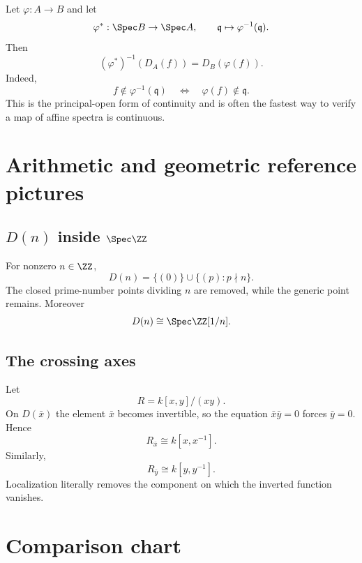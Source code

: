 Let $\varphi:A\to B$ and let
\[
\varphi^\ast:\Spec B\to\Spec A,
\qquad
\mathfrak q\mapsto\varphi^{-1}(\mathfrak q).
\]
Then
\[
(\varphi^\ast)^{-1}(D_A(f))=D_B(\varphi(f)).
\]
Indeed,
\[
f\notin\varphi^{-1}(\mathfrak q)
\quad\Longleftrightarrow\quad
\varphi(f)\notin\mathfrak q.
\]
This is the principal-open form of continuity and is often the fastest way to verify a map
of affine spectra is continuous.

\section{Arithmetic and geometric reference pictures}

\subsection{\texorpdfstring{$D(n)$ inside $\Spec\ZZ$}{D(n) inside Spec Z}}
For nonzero $n\in\ZZ$,
\[
D(n)=\{(0)\}\cup\{(p):p\nmid n\}.
\]
The closed prime-number points dividing $n$ are removed, while the generic point remains.
Moreover
\[
D(n)\cong\Spec\ZZ[1/n].
\]



\subsection{The crossing axes}
Let
\[
R=k[x,y]/(xy).
\]
On $D(\bar x)$ the element $\bar x$ becomes invertible, so the equation
$\bar x\bar y=0$ forces $\bar y=0$.  Hence
\[
R_{\bar x}\cong k[x,x^{-1}].
\]
Similarly,
\[
R_{\bar y}\cong k[y,y^{-1}].
\]
Localization literally removes the component on which the inverted function vanishes.



\section{Comparison chart}

